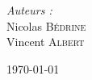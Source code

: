 \begin{titlepage}
\begin{center}
	\begin{minipage}[t]{0.3\textwidth}
 	 	\begin{flushleft} \large
  		\end{flushleft}
	\end{minipage}
	\begin{minipage}[t]{0.6\textwidth}
  		\begin{flushright} \large
    		\emph{Auteurs :} \\
    		Nicolas \textsc{Bédrine} \\
    		Vincent \textsc{Albert} \\
  		\end{flushright}
	\end{minipage}

\vfill

{\large \today{}}

\end{center}

\end{titlepage}

